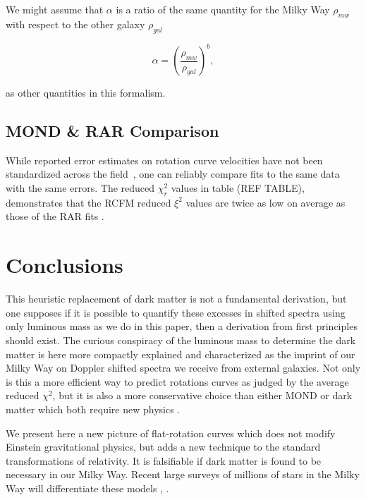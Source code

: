 \documentclass[reprint,%
 amsmath,amssymb,
 aps,
]{revtex4-1}
\begin{document}
We might assume that $\alpha$ is a ratio of the same quantity for  the Milky Way $\rho_{mw}$ with respect to the other   galaxy $\rho_{gal}$  

\begin{equation}
\alpha=\left(\frac{\rho_{mw}}{\rho_{gal}}\right)^{b}  ,
\label{correl}
\end{equation}

as other quantities in this formalism.
 
\subsection{MOND  \& RAR Comparison}

While reported error    estimates on rotation curve velocities  have not been standardized across the field~\citep{Blok,Gent},     one can reliably   compare fits to the same data with the same  errors. The     reduced $\chi^2_r$ values in table (REF TABLE), demonstrates that the RCFM reduced $\xi^2$ values are twice as low on average as those of the RAR fits  \cite{McGaugh2016RAR}  .

 
 
 \section{  Conclusions \label{sec:conclu}  }
 

{\color{red} This heuristic replacement of dark matter is not a fundamental derivation, but    one supposes if it is possible to quantify these
excesses in shifted spectra using only luminous mass as we do in this paper,  then a       derivation from first principles should   exist.  The curious conspiracy of the luminous mass to   determine the dark matter  is here more compactly explained and characterized as the imprint of our Milky Way on Doppler shifted spectra we receive from external galaxies. Not only is this a more efficient way to predict rotations curves as judged by the average reduced $\chi^2$, but it is also a  more conservative choice than either MOND or dark matter which both require new physics \cite{de_Blok_2010}.  
  
 
 

  
 
   
 
We   present here a new picture of flat-rotation curves which does not   modify Einstein gravitational physics, but adds a new technique to the standard transformations of   relativity. It is falsifiable if dark matter is found to be necessary in our Milky Way.   Recent large surveys of millions of  stars in the Milky Way will differentiate these models     \cite{2022ApJS..259...35A}, \cite{2010ApJ...716....1B}.
  }
  
\end{document}
